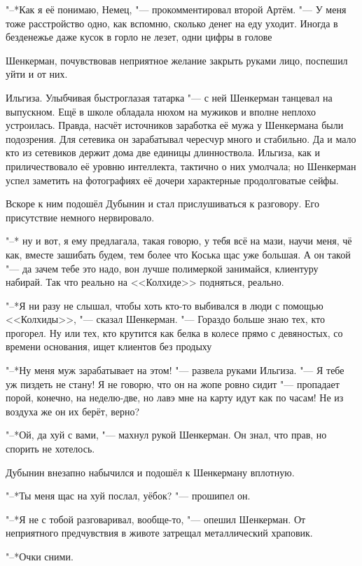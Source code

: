 "--*Как я её понимаю, Немец, "--- прокомментировал второй Артём.
"--- У меня тоже расстройство одно, как вспомню, сколько денег на еду уходит.
Иногда в безденежье даже кусок в горло не лезет, одни цифры в голове\ldotst

Шенкерман, почувствовав неприятное желание закрыть руками лицо, поспешил уйти и от них.

Ильгиза.
Улыбчивая быстроглазая татарка "--- с ней Шенкерман танцевал на выпускном.
Ещё в школе обладала нюхом на мужиков и вполне неплохо устроилась.
Правда, насчёт источников заработка её мужа у Шенкермана были подозрения.
Для сетевика он зарабатывал чересчур много и стабильно.
Да и мало кто из сетевиков держит дома две единицы длинноствола.
Ильгиза, как и приличествовало её уровню интеллекта, тактично о них умолчала;
но Шенкерман успел заметить на фотографиях её дочери характерные продолговатые сейфы.

Вскоре к ним подошёл Дубынин и стал прислушиваться к разговору.
Его присутствие немного нервировало.

"--* \ldotst ну и вот, я ему предлагала, такая говорю, у тебя всё на мази, научи меня, чё как, вместе зашибать будем, тем более что Коська щас уже большая.
А он такой "--- да зачем тебе это надо, вон лучше полимеркой занимайся, клиентуру набирай.
Так что реально на <<Колхиде>> подняться, реально.

"--*Я ни разу не слышал, чтобы хоть кто-то выбивался в люди с помощью <<Колхиды>>, "--- сказал Шенкерман.
"--- Гораздо больше знаю тех, кто прогорел.
Ну или тех, кто крутится как белка в колесе прямо с девяностых, со времени основания, ищет клиентов без продыху\ldotst

"--*Ну меня муж зарабатывает на этом! "--- развела руками Ильгиза.
"--- Я тебе уж пиздеть не стану!
Я не говорю, что он на жопе ровно сидит "--- пропадает порой, конечно, на неделю-две, но лавэ мне на карту идут как по часам!
Не из воздуха же он их берёт, верно?

"--*Ой, да хуй с вами, "--- махнул рукой Шенкерман.
Он знал, что прав, но спорить не хотелось.

Дубынин внезапно набычился и подошёл к Шенкерману вплотную.

"--*Ты меня щас на хуй послал, уёбок? "--- прошипел он.

"--*Я не с тобой разговаривал, вообще-то, "--- опешил Шенкерман.
От неприятного предчувствия в животе затрещал металлический храповик.

"--*Очки сними.

